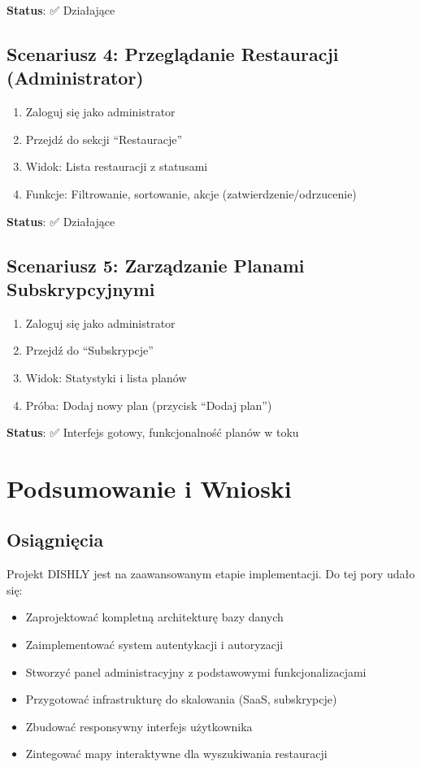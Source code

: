 ﻿\documentclass[12pt,a4paper,utf-8]{article}
\begin{document}
\textbf{Status}: ✅ Działające

\subsection{Scenariusz 4: Przeglądanie Restauracji (Administrator)}

\begin{enumerate}
    \item Zaloguj się jako administrator
    \item Przejdź do sekcji ``Restauracje''
    \item Widok: Lista restauracji z statusami
    \item Funkcje: Filtrowanie, sortowanie, akcje (zatwierdzenie/odrzucenie)
\end{enumerate}

\textbf{Status}: ✅ Działające

\subsection{Scenariusz 5: Zarządzanie Planami Subskrypcyjnymi}

\begin{enumerate}
    \item Zaloguj się jako administrator
    \item Przejdź do ``Subskrypcje''
    \item Widok: Statystyki i lista planów
    \item Próba: Dodaj nowy plan (przycisk ``Dodaj plan'')
\end{enumerate}

\textbf{Status}: ✅ Interfejs gotowy, funkcjonalność planów w toku

\newpage

\section{Podsumowanie i Wnioski}

\subsection{Osiągnięcia}

Projekt DISHLY jest na zaawansowanym etapie implementacji. Do tej pory udało się:

\begin{itemize}
    \item Zaprojektować kompletną architekturę bazy danych
    \item Zaimplementować system autentykacji i autoryzacji
    \item Stworzyć panel administracyjny z podstawowymi funkcjonalizacjami
    \item Przygotować infrastrukturę do skalowania (SaaS, subskrypcje)
    \item Zbudować responsywny interfejs użytkownika
    \item Zintegować mapy interaktywne dla wyszukiwania restauracji
\end{itemize}
\end{document}
